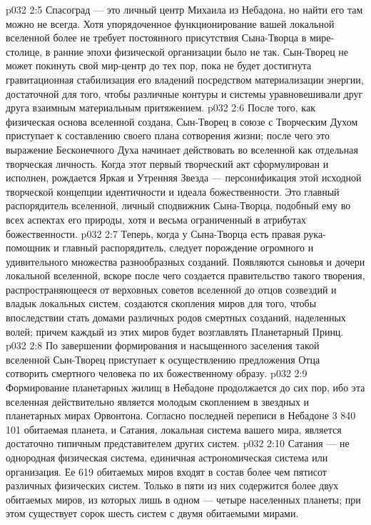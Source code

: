 \vs p032 2:5 Спасоград --- это личный центр Михаила из Небадона, но найти его там можно не всегда. Хотя упорядоченное функционирование вашей локальной вселенной более не требует постоянного присутствия Сына\hyp{}Творца в мире\hyp{}столице, в ранние эпохи физической организации было не так. Сын\hyp{}Творец не может покинуть свой мир\hyp{}центр до тех пор, пока не будет достигнута гравитационная стабилизация его владений посредством материализации энергии, достаточной для того, чтобы различные контуры и системы уравновешивали друг друга взаимным материальным притяжением.
\vs p032 2:6 \pc После того, как физическая основа вселенной создана, Сын\hyp{}Творец в союзе с Творческим Духом приступает к составлению своего плана сотворения жизни; после чего это выражение Бесконечного Духа начинает действовать во вселенной как отдельная творческая личность. Когда этот первый творческий акт сформулирован и исполнен, рождается Яркая и Утренняя Звезда --- персонификация этой исходной творческой концепции идентичности и идеала божественности. Это главный распорядитель вселенной, личный сподвижник Сына\hyp{}Творца, подобный ему во всех аспектах его природы, хотя и весьма ограниченный в атрибутах божественности.
\vs p032 2:7 Теперь, когда у Сына\hyp{}Творца есть правая рука\hyp{}помощник и главный распорядитель, следует порождение огромного и удивительного множества разнообразных созданий. Появляются сыновья и дочери локальной вселенной, вскоре после чего создается правительство такого творения, распространяющееся от верховных советов вселенной до отцов созвездий и владык локальных систем, создаются скопления миров для того, чтобы впоследствии стать домами различных родов смертных созданий, наделенных волей; причем каждый из этих миров будет возглавлять Планетарный Принц.
\vs p032 2:8 По завершении формирования и насыщенного заселения такой вселенной Сын\hyp{}Творец приступает к осуществлению предложения Отца сотворить смертного человека по их божественному образу.
\vs p032 2:9 \pc Формирование планетарных жилищ в Небадоне продолжается до сих пор, ибо эта вселенная действительно является молодым скоплением в звездных и планетарных мирах Орвонтона. Согласно последней переписи в Небадоне 3 840 101 обитаемая планета, и Сатания, локальная система вашего мира, является достаточно типичным представителем других систем.
\vs p032 2:10 Сатания --- не однородная физическая система, единичная астрономическая система или организация. Ее 619 обитаемых миров входят в состав более чем пятисот различных физических систем. Только в пяти из них содержится более двух обитаемых миров, из которых лишь в одном --- четыре населенных планеты; при этом существует сорок шесть систем с двумя обитаемыми мирами.
